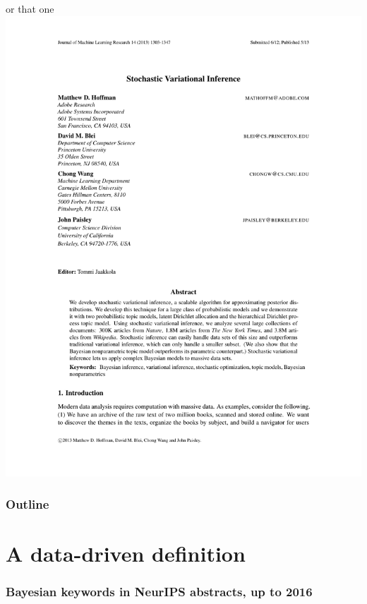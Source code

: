 \documentclass[10pt]{beamer}
\begin{document}
\begin{frame}{or that one}
{{    \includegraphics[trim={0cm 0 0 15cm},clip,width=\textwidth]{Papers/svi.pdf}
  }
}
\end{frame}

\begin{frame}
\frametitle{Outline}
\tableofcontents
\end{frame}

\section{A data-driven definition}
\begin{frame}
  \frametitle{Bayesian keywords in NeurIPS abstracts, up to 2016}
  \begin{figure}
    \label{f:papers}
\end{figure}
\end{frame}
\end{document}
